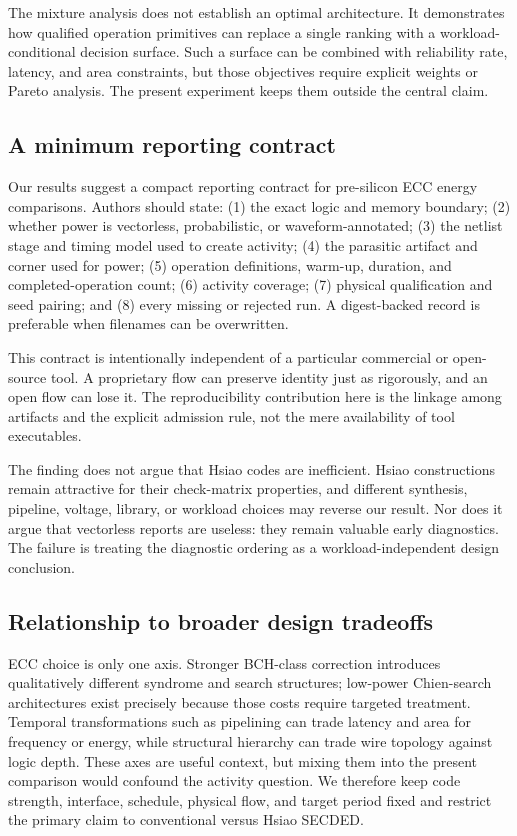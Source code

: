 \documentclass[conference,10pt]{IEEEtran}
\begin{document}
The mixture analysis does not establish an optimal architecture. It demonstrates how qualified operation primitives can replace a single ranking with a workload-conditional decision surface. Such a surface can be combined with reliability rate, latency, and area constraints, but those objectives require explicit weights or Pareto analysis. The present experiment keeps them outside the central claim.

\subsection{A minimum reporting contract}
Our results suggest a compact reporting contract for pre-silicon ECC energy comparisons. Authors should state: (1) the exact logic and memory boundary; (2) whether power is vectorless, probabilistic, or waveform-annotated; (3) the netlist stage and timing model used to create activity; (4) the parasitic artifact and corner used for power; (5) operation definitions, warm-up, duration, and completed-operation count; (6) activity coverage; (7) physical qualification and seed pairing; and (8) every missing or rejected run. A digest-backed record is preferable when filenames can be overwritten.

This contract is intentionally independent of a particular commercial or open-source tool. A proprietary flow can preserve identity just as rigorously, and an open flow can lose it. The reproducibility contribution here is the linkage among artifacts and the explicit admission rule, not the mere availability of tool executables.

The finding does not argue that Hsiao codes are inefficient. Hsiao constructions remain attractive for their check-matrix properties, and different synthesis, pipeline, voltage, library, or workload choices may reverse our result. Nor does it argue that vectorless reports are useless: they remain valuable early diagnostics. The failure is treating the diagnostic ordering as a workload-independent design conclusion.

\subsection{Relationship to broader design tradeoffs}
ECC choice is only one axis. Stronger BCH-class correction introduces qualitatively different syndrome and search structures; low-power Chien-search architectures exist precisely because those costs require targeted treatment. Temporal transformations such as pipelining can trade latency and area for frequency or energy, while structural hierarchy can trade wire topology against logic depth. These axes are useful context, but mixing them into the present comparison would confound the activity question. We therefore keep code strength, interface, schedule, physical flow, and target period fixed and restrict the primary claim to conventional versus Hsiao SECDED.
\end{document}
